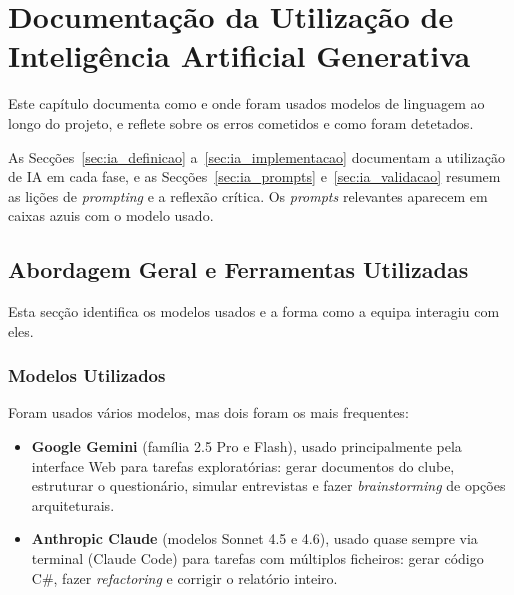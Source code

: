 
\chapter{Documentação da Utilização de Inteligência Artificial Generativa}\label{chap:documentacao_ia}

Este capítulo documenta como e onde foram usados modelos de linguagem ao longo do projeto, e reflete sobre os erros cometidos e como foram detetados.

As Secções~\ref{sec:ia_definicao} a~\ref{sec:ia_implementacao} documentam a utilização de IA em cada fase, e as Secções~\ref{sec:ia_prompts} e~\ref{sec:ia_validacao} resumem as lições de \textit{prompting} e a reflexão crítica. Os \textit{prompts} relevantes aparecem em caixas azuis com o modelo usado.


\section{Abordagem Geral e Ferramentas Utilizadas}\label{sec:ia_abordagem}

Esta secção identifica os modelos usados e a forma como a equipa interagiu com eles.

\subsection{Modelos Utilizados}

Foram usados vários modelos, mas dois foram os mais frequentes:

\begin{itemize}
    \item \textbf{Google Gemini} (família 2.5 Pro e Flash), usado principalmente pela interface Web para tarefas exploratórias: gerar documentos do clube, estruturar o questionário, simular entrevistas e fazer \textit{brainstorming} de opções arquiteturais.

    \item \textbf{Anthropic Claude} (modelos Sonnet 4.5 e 4.6), usado quase sempre via terminal (Claude Code) para tarefas com múltiplos ficheiros: gerar código C\#, fazer \textit{refactoring} e corrigir o relatório inteiro.
\end{itemize}

